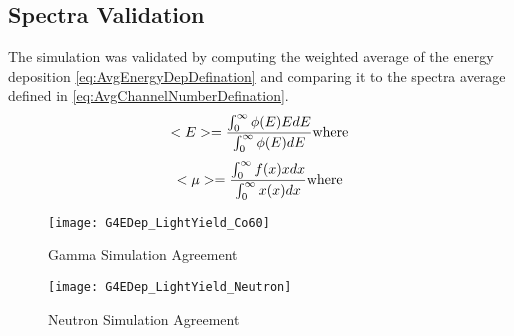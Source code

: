 \subsection{Spectra Validation}
The simulation was validated by computing the weighted average of the energy deposition \ref{eq:AvgEnergyDepDefination} and comparing it to the spectra average defined in \ref{eq:AvgChannelNumberDefination}.
\begin{equation}
\label{eq:AvgEnergyDepDefination}
<E> = \frac{\int_0^\infty {\phi(E)EdE}}{\int_0^\infty{\phi(E)dE}} \\
\text{where}
\end{equation}
\begin{equation}
\label{eq:AvgChannelNumberDefination}
<\mu> = \frac{\int_0^\infty {f(x)xdx}}{\int_0^\infty{x(x)dx}} \\
\text{where}
\end{equation}
\begin{figure}
    \centering
    \caption{Gamma Simulation Agreement}
    \texttt{[image: G4EDep\_LightYield\_Co60]}
    \label{fig:GammaSimAgreement}
\end{figure}
\begin{figure}
    \centering
    \caption{Neutron Simulation Agreement}
    \texttt{[image: G4EDep\_LightYield\_Neutron]}
    \label{fig:NeutronSimAgreement}
\end{figure}

